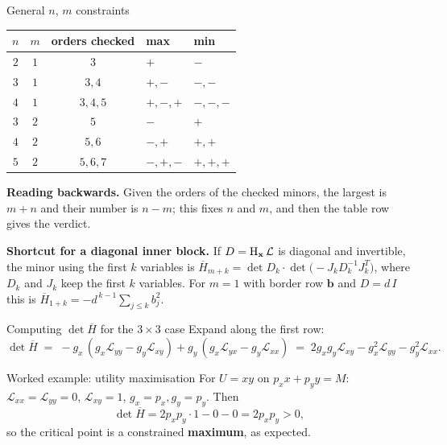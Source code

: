 \begin{rulebox}{General $n$, $m$ constraints}
\begin{center}\footnotesize
\begin{tabular}{cccll}
  \hline
  $n$ & $m$ & orders checked & max & min\\
  \hline
  $2$ & $1$ & $3$ & $+$ & $-$\\
  $3$ & $1$ & $3,4$ & $+,-$ & $-,-$\\
  $4$ & $1$ & $3,4,5$ & $+,-,+$ & $-,-,-$\\
  $3$ & $2$ & $5$ & $-$ & $+$\\
  $4$ & $2$ & $5,6$ & $-,+$ & $+,+$\\
  $5$ & $2$ & $5,6,7$ & $-,+,-$ & $+,+,+$\\
  \hline
\end{tabular}
\end{center}
\textbf{Reading backwards.} Given the orders of the checked minors, the
largest is $m+n$ and their number is $n-m$; this fixes $n$ and $m$, and then
the table row gives the verdict.

\textbf{Shortcut for a diagonal inner block.} If
$D=\operatorname{H}_{\mathbf{x}}\mathcal{L}$ is diagonal and invertible, the minor
using the first $k$ variables is
$\overline{H}_{m+k}=\det D_k\cdot\det\bigl(-J_kD_k^{-1}J_k^{T}\bigr)$,
where $D_k$ and $J_k$ keep the first $k$ variables. For $m=1$ with border
row $\mathbf{b}$ and $D=d\,I$ this is
$\overline{H}_{1+k}=-d^{\,k-1}\sum_{j\le k}b_j^{2}$.
\end{rulebox}

\begin{rulebox}{Computing $\det \overline{H}$ for the $3 \times 3$ case}
Expand along the first row:
\[
\det \overline{H} \;=\; -g_x \, (g_x \mathcal{L}_{yy} - g_y \mathcal{L}_{xy})
+ g_y \, (g_x \mathcal{L}_{yx} - g_y \mathcal{L}_{xx})
\;=\; 2 g_x g_y \mathcal{L}_{xy} - g_x^2 \mathcal{L}_{yy}
- g_y^2 \mathcal{L}_{xx}.
\]
\end{rulebox}

\begin{rulebox}{Worked example: utility maximisation}
For $U = x y$ on $p_x x + p_y y = M$:
$\mathcal{L}_{xx} = \mathcal{L}_{yy} = 0$, $\mathcal{L}_{xy} = 1$,
$g_x = p_x, g_y = p_y$. Then
\[
\det \overline{H} = 2 p_x p_y \cdot 1 - 0 - 0 = 2 p_x p_y > 0,
\]
so the critical point is a constrained \textbf{maximum}, as expected.
\end{rulebox}

